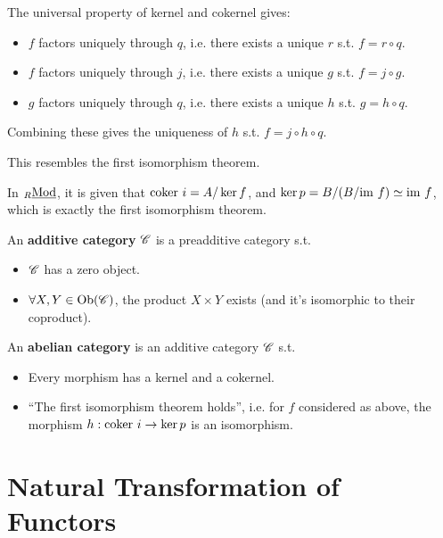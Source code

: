 The universal property of kernel and cokernel gives:
\begin{itemize}
    \item $f$ factors uniquely through $q$, i.e. there exists a unique $r$ s.t. $f = r \circ q$.
    \item $f$ factors uniquely through $j$, i.e. there exists a unique $g$ s.t. $f = j \circ g$.
    \item $g$ factors uniquely through $q$, i.e. there exists a unique $h$ s.t. $g = h \circ q$.
\end{itemize}

Combining these gives the uniqueness of $h$ s.t. $f = j \circ h \circ q$.

\begin{remark}
    This resembles the first isomorphism theorem. 
    
    In ${}_{R}\underline{\textup{Mod}}$, it is given that $\mathrm{coker}\  i = A / \ker f$, and $\ker p = B / (B / \mathrm{im}\  f) \simeq \mathrm{im}\  f$, which is exactly the first isomorphism theorem. 
\end{remark}

\begin{definition}
    An \textbf{additive category} $\mathscr{C}$ is a preadditive category s.t. 
    \begin{itemize}
        \item $\mathscr{C}$ has a zero object.
        \item $\forall X, Y \in \mathrm{Ob}(\mathscr{C})$, the product $X \times Y$ exists (and it's isomorphic to their coproduct).
    \end{itemize}
\end{definition}

\begin{definition}
    An \textbf{abelian category} is an additive category $\mathscr{C}$ s.t. 
    \begin{itemize}
        \item Every morphism has a kernel and a cokernel.
        \item ``The first isomorphism theorem holds'', i.e. for $f$ considered as above, the morphism $h: \mathrm{coker}\  i \to \ker p$ is an isomorphism. 
    \end{itemize}
\end{definition}

\section{Natural Transformation of Functors}

